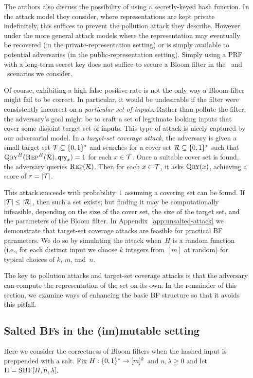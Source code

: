 The authors also discuss the possibility of using a secretly-keyed
hash function. In the attack model they consider, where representations are kept
private indefinitely, this suffices to prevent the pollution attack they
describe. However, under the more general attack models where the representation
may eventually be recovered (in the private-representation setting) or is simply
available to potential adversaries (in the public-representation setting).
Simply using a PRF with a long-term secret key does not suffice to
secure a Bloom filter in the \errep\ and \erreps\ scenarios we consider.

%
Of course, exhibiting a high false positive rate is not the only way a Bloom
filter might fail to be correct. In particular, it would be undesirable if the
filter were consistently incorrect on a \emph{particular set of inputs}. Rather
than pollute the filter, the adversary's goal might be to craft a set of
legitimate looking inputs that cover some disjoint target set of inputs.
%
This type of attack is nicely captured by our adversarial model.
%
In a \emph{target-set coverage attack}, the adversary is given a small target set
$\mathcal{T}\subseteq\{0,1\}^*$ and searches for a cover set $\mathcal{R}\subseteq\{0,1\}^*$
such that $\textnormal{\textsc{Qry}}^H(\textnormal{\textsc{Rep}}^H(\mathcal{R}),\mathsf{qry}_x)=1$ for each $x\in\mathcal{T}$.
%
Once a suitable cover set is found, the adversary queries $\textnormal{\textsc{Rep}}(\mathcal{R})$. Then
for each $x\in\mathcal{T}$, it asks $\textnormal{\textsc{Qry}}(x)$, achieving a score of $r = |\mathcal{T}|$.

This  attack succeeds with probability~$1$ assuming a covering set can
be found.  If $|\mathcal{T}| \leq |\mathcal{R}|$, then such a set exists; but finding it may be
computationally infeasible, depending on the size of the cover set, the size of
the target set, and the parameters of the Bloom filter.
%
In Appendix~\ref{app:unsalted-attack} we demonstrate that target-set coverage
attacks are feasible for practical BF parameters. We do so by simulating the
attack when~$H$ is a random function (i.e., for each distinct input we choose
$k$ integers from $[m]$ at random) for typical choices of $k$, $m$, and~$n$.
%

The key to pollution attacks and target-set coverage attacks is that the
adversary can compute the representation of the set on its own. In the remainder
of this section, we examine ways of enhancing the basic BF structure so that it
avoids this pitfall.

\subsection{Salted BFs in the (im)mutable setting}
%
Here we consider the correctness of Bloom filters when the hashed input is
preppended with a salt.
%
Fix $H:\{0,1\}^*\to[m]^k$ and $n,\lambda\geq0$ and let
$\Pi = \textnormal{\textsc{SBF}}[H,n,\lambda]$.

